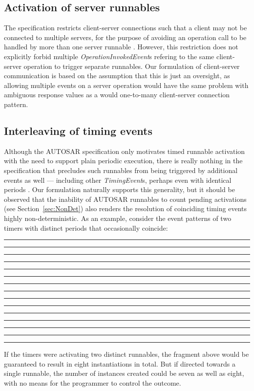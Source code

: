 \documentclass[twocolumn]{article}
\begin{document}
\subsection{Activation of server runnables}

The specification restricts client-server connections such that a client may not be connected to multiple servers, for the purpose of avoiding an operation call to be handled by more than one server runnable \cite[ch.~4.2.3]{AR:RTE}. However, this restriction does not explicitly forbid multiple \emph{OperationInvokedEvent}s refering to the same client-server operation to trigger separate runnables. Our formulation of client-server communication is based on the assumption that this is just an oversight, as allowing multiple events on a server operation would have the same problem with ambiguous response values as a would one-to-many client-server connection pattern. %


\subsection{Interleaving of timing events}

Although the AUTOSAR specification only motivates timed runnable activation with the need to support plain periodic execution, there is really nothing in the specification that precludes such runnables from being triggered by additional events as well --- including other \emph{TimingEvent}s, perhaps even with identical periods \cite[table~7.1, ch.~7.2.3]{AR:SWC}. Our formulation naturally supports this generality, but it should be observed that the inability of AUTOSAR runnables to count pending activations (see Section~\ref{sec:NonDet}) also renders the resolution of coinciding timing events highly non-deterministic. As an example, consider the event patterns of two timers with distinct periods that occasionally coincide:
\begin{center}
\rule{3mm}{1pt}%
						\rule[-9pt]{1mm}{10pt}%
\rule{2mm}{1pt}%
													\rule{1mm}{10pt}%
\rule{7mm}{1pt}%
						\rule[-9pt]{1mm}{10pt}%
\rule{1mm}{1pt}%
													\rule{1mm}{10pt}%
\rule{9mm}{1pt}%
									\rule[-9pt]{1mm}{19pt}%
\rule{9mm}{1pt}%
													\rule{1mm}{10pt}%
\rule{1mm}{1pt}%
						\rule[-9pt]{1mm}{10pt}%
\rule{4mm}{1pt}%
\end{center}
If the timers were activating two distinct runnables, the fragment above would be guaranteed to result in eight instantiations in total. But if directed towards a single runnable, the number of instances created could be seven as well as eight, with no means for the programmer to control the outcome.
\end{document}
